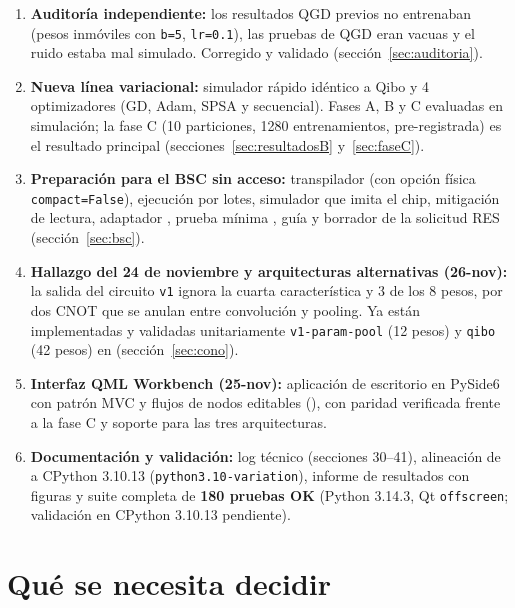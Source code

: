 \documentclass[11pt,a4paper]{article}
\begin{document}
\begin{enumerate}
  \item \textbf{Auditoría independiente:} los resultados QGD previos no entrenaban (pesos inmóviles con \texttt{b=5},
        \texttt{lr=0.1}), las pruebas de QGD eran vacuas y el ruido estaba mal simulado. Corregido y validado
        (sección~\ref{sec:auditoria}).
  \item \textbf{Nueva línea variacional:} simulador rápido idéntico a Qibo y 4 optimizadores (GD, Adam, SPSA y
        secuencial). Fases A, B y C evaluadas en simulación; la fase C (10 particiones, 1280 entrenamientos,
        pre-registrada) es el resultado principal (secciones~\ref{sec:resultadosB} y~\ref{sec:faseC}).
  \item \textbf{Preparación para el BSC sin acceso:} transpilador (con opción física \texttt{compact=False}), ejecución
        por lotes, simulador que imita el chip, mitigación de lectura, adaptador , prueba
        mínima , guía  y borrador de la
        solicitud RES (sección~\ref{sec:bsc}).
  \item \textbf{Hallazgo del 24 de noviembre y arquitecturas alternativas (26-nov):} la salida del circuito \texttt{v1}
        ignora la cuarta característica y 3 de los 8 pesos, por dos CNOT que se anulan entre convolución y pooling. Ya
        están implementadas y validadas unitariamente \texttt{v1-param-pool} (12 pesos) y \texttt{qibo} (42 pesos) en
         (sección~\ref{sec:cono}).
  \item \textbf{Interfaz QML Workbench (25-nov):} aplicación de escritorio en PySide6 con patrón MVC y flujos de nodos
        editables (), con paridad verificada frente a la fase C y soporte para las tres arquitecturas.
  \item \textbf{Documentación y validación:} log técnico (secciones 30--41), alineación de  a
        CPython 3.10.13 (\texttt{python3.10-variation}), informe de resultados con figuras y suite completa de
        \textbf{180 pruebas OK} (Python 3.14.3, Qt \texttt{offscreen}; validación en CPython 3.10.13 pendiente).
\end{enumerate}

\section{Qué se necesita decidir}
\end{document}
